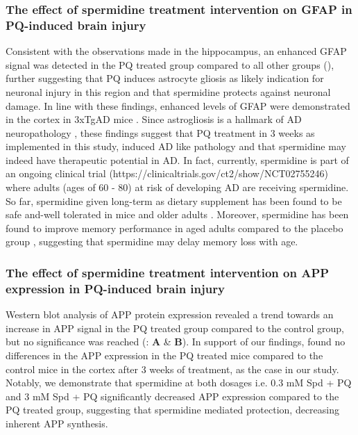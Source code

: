 \subsubsection{The effect of spermidine treatment intervention on GFAP in PQ-induced brain injury}
Consistent with the observations made in the hippocampus, an enhanced GFAP signal was detected in the PQ treated group compared to all other groups (), further suggesting that PQ induces astrocyte gliosis as likely indication for neuronal injury in this region and that spermidine protects against neuronal damage. In line with these findings, enhanced levels of GFAP were demonstrated in the cortex in 3xTgAD mice \citep{Kamphuis2014,Oddo2003}. Since astrogliosis is a hallmark of AD neuropathology \citep{Gotz2001,Grundke-Iqbal1989}, these findings suggest that PQ treatment in 3 weeks as implemented in this study, induced AD like pathology and that spermidine may indeed have therapeutic potential in AD. In fact, currently, spermidine is part of an ongoing clinical trial (https://clinicaltrials.gov/ct2/show/NCT02755246) where adults (ages of 60 - 80) at risk of developing AD are receiving spermidine. So far, spermidine given long-term as dietary supplement has been found to be safe and-well tolerated in mice and older adults \citep{Schwarz2018}. Moreover, spermidine has been found to improve memory performance in aged adults compared to the placebo group \citep{Wirth2018}, suggesting that spermidine may delay memory loss with age.

\subsubsection{The effect of spermidine treatment intervention on APP expression in PQ-induced brain injury}
Western blot analysis of APP protein expression revealed a trend towards an increase in APP signal in the PQ treated group compared to the control group, but no significance was reached  (: \textbf{A} \& \textbf{B}). In support of our findings, \citet{Chen2012} found no differences in the APP expression in the PQ treated mice compared to the control mice in the cortex after 3 weeks of treatment, as the case in our study. Notably, we demonstrate that spermidine at both dosages i.e. 0.3 mM Spd + PQ and 3 mM Spd + PQ significantly decreased APP expression compared to the PQ treated group, suggesting that spermidine mediated protection, decreasing inherent APP synthesis. 

